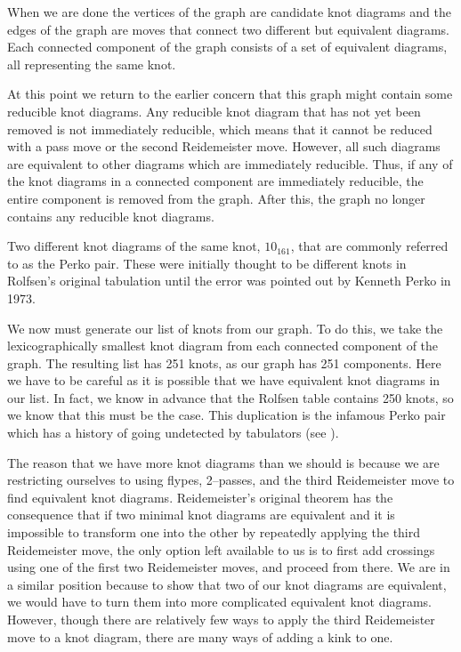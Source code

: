 \begin{paper}
When we are done the vertices of the graph are candidate knot diagrams and the
edges of the graph are moves that connect two different but equivalent diagrams.
Each connected component of the graph consists of a set of equivalent diagrams,
all representing the same knot.

At this point we return to the earlier concern that this graph might contain
some reducible knot diagrams.
Any reducible knot diagram that has not yet been removed is not immediately
reducible, which means that it cannot be reduced with a pass move or the second
Reidemeister move.
However, all such diagrams are equivalent to other diagrams which are
immediately reducible.
Thus, if any of the knot diagrams in a connected component are immediately
reducible, the entire component is removed from the graph.
After this, the graph no longer contains any reducible knot diagrams.

{Two different knot diagrams of the same knot, $10_{161}$, that are commonly
referred to as the Perko pair.
These were initially thought to be different knots in Rolfsen's original
tabulation until the error was pointed out by Kenneth Perko in 1973.}

We now must generate our list of knots from our graph.
To do this, we take the lexicographically smallest knot diagram from each
connected component of the graph.
The resulting list has 251 knots, as our graph has 251 components.
Here we have to be careful as it is possible that we have equivalent knot
diagrams in our list.
In fact, we know in advance that the Rolfsen table contains 250 knots, so we
know that this must be the case.
This duplication is the infamous Perko pair which has a
history of going undetected by tabulators (see \figPerko).

The reason that we have more knot diagrams than we should is because we are
restricting ourselves to using flypes, 2--passes, and the third Reidemeister
move to find equivalent knot diagrams.
Reidemeister's original theorem has the consequence that if two minimal knot
diagrams are equivalent and it is impossible to transform one into the other by
repeatedly applying the third Reidemeister move, the only option left available
to us is to first add crossings using one of the first two Reidemeister moves,
and proceed from there.
We are in a similar position because to show that two of our knot diagrams are
equivalent, we would have to turn them into more complicated equivalent knot
diagrams.
However, though there are relatively few ways to apply the third Reidemeister
move to a knot diagram, there are many ways of adding a kink to one.


\end{paper}
